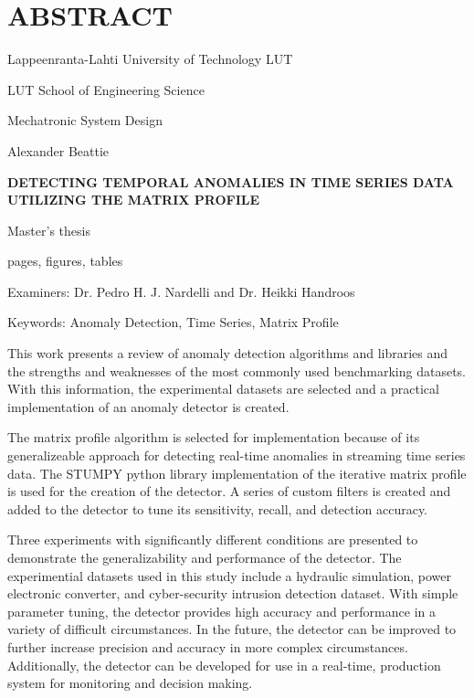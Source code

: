 \section*{\MakeUppercase{Abstract}}
{}%
\thispagestyle{empty}
\begin{singlespace} 
{
Lappeenranta-Lahti University of Technology LUT \bigskip

\parskip=0pt %

LUT School of Engineering Science \bigskip

Mechatronic System Design \bigskip

Alexander Beattie \bigskip \bigskip

\textbf{\MakeUppercase{Detecting Temporal Anomalies in Time Series Data}} \\
\textbf{\MakeUppercase{Utilizing the Matrix Profile}} \bigskip\bigskip

Master's thesis \bigskip

\the\year{} \bigskip

\pageref{LastPage} pages,  figures,  tables \bigskip

Examiners: Dr. Pedro H. J. Nardelli and Dr. Heikki Handroos \bigskip\bigskip

Keywords: Anomaly Detection, Time Series, Matrix Profile \bigskip
}

This work presents a review of anomaly detection algorithms and libraries and the strengths and weaknesses of the most commonly used benchmarking datasets. With this information, the experimental datasets are selected and a practical implementation of an anomaly detector is created.

The matrix profile algorithm is selected for implementation because of its generalizeable approach for detecting real-time anomalies in streaming time series data.
The STUMPY python library implementation of the iterative matrix profile is used for the creation of the detector.
A series of custom filters is created and added to the detector to tune its sensitivity, recall, and detection accuracy. 

Three experiments with significantly different conditions are presented to demonstrate the generalizability and performance of the detector.
The experimential datasets used in this study include a hydraulic simulation, power electronic converter, and cyber-security intrusion detection dataset.
With simple parameter tuning, the detector provides high accuracy and performance in a variety of difficult circumstances.
In the future, the detector can be improved to further increase precision and accuracy in more complex circumstances.
Additionally, the detector can be developed for use in a real-time, production system for monitoring and decision making.
\end{singlespace}
